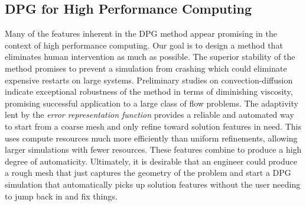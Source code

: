\documentclass[preprint,12pt]{elsarticle}
\begin{document}
\subsection{DPG for High Performance Computing}
Many of the features inherent in the DPG method appear promising in the context of high performance computing.
Our goal is to design a method that eliminates human intervention as much as possible.
The superior stability of the method promises to prevent a simulation from crashing which could eliminate expensive restarts on large systems.
Preliminary studies on convection-diffusion indicate exceptional robustness of the method in terms of diminishing viscosity, 
promising successful application to a large class of flow problems.
The adaptivity lent by the \emph{error representation function} provides a reliable and automated way to start from a coarse mesh and only refine
toward solution features in need. 
This uses compute resources much more efficiently than uniform refinements, allowing larger simulations with fewer resources.
These features combine to produce a high degree of automaticity.
Ultimately, it is desirable that an engineer could produce a rough mesh that just captures the geometry of the problem and
start a DPG simulation that automatically picks up solution features without the user needing to jump back in and fix things.
\end{document}
